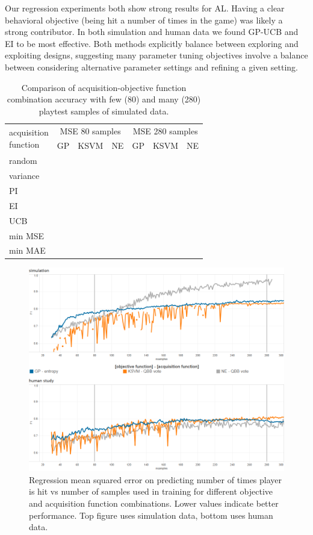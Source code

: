 \documentclass{sig-alternate}
\begin{document}
Our regression experiments both show strong results for AL.
Having a clear behavioral objective (being hit a number of times in the game) was likely a strong contributor.
In both simulation and human data we found GP-UCB and EI to be most effective.
Both methods explicitly balance between exploring and exploiting designs, suggesting many parameter tuning objectives involve a balance between considering alternative parameter settings and refining a given setting.

\begin{table}[tb]
\centering
\caption{Comparison of acquisition-objective function combination accuracy with few (80) and many (280) playtest samples of simulated data.}
\begin{tabularx}{0.46\textwidth}{|X|c|c|c|c|c|c|}
\hline \multirow{2}{*}{\parbox[t]{5cm}{acquisition \\ function}} & \multicolumn{3}{|c|}{MSE 80 samples} & \multicolumn{3}{|c|}{MSE 280 samples}  \\ \cline{2-7}
& GP & KSVM & NE & GP & KSVM & NE \\ 
\hline random &  &  &  &  &  &  \\ 
\hline variance &  &  &  &  &  &  \\ 
\hline PI &  &  &  &  &  &  \\ 
\hline EI &  &  &  &  &  &  \\ 
\hline UCB &  &  &  &  &  &  \\ 
\hline min MSE &  &  &  &  &  &  \\ 
\hline min MAE &  &  &  &  &  &  \\ 
\hline 
\end{tabularx}
\label{tab:reg_sim}
\end{table}


\begin{figure}[tb]
\centering
\includegraphics[width=\linewidth]{classification_results}
\caption{Regression mean squared error on predicting number of times player is hit vs number of samples used in training for different objective and acquisition function combinations. Lower values indicate better performance. Top figure uses simulation data, bottom uses human data.}
\label{fig:reg_all}
\end{figure}
\end{document}
